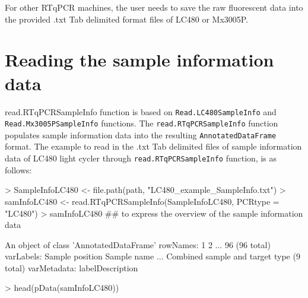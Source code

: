 \documentclass[11pt]{article}
\newcommand{\code}[1]{{\tt #1}}
\begin{document}
For other RTqPCR machines, the user needs to save the raw fluorescent data into the provided
.txt Tab delimited format files of LC480 or Mx3005P. 
\section{Reading the sample information data} 
read.RTqPCRSampleInfo function is based on \code{Read.LC480SampleInfo} and \code{Read.Mx3005PSampleInfo} 
functions. The \code{read.RTqPCRSampleInfo} function populates sample information data into the resulting 
\code{AnnotatedDataFrame} format. The example to read in the .txt Tab delimited files of sample information
data of LC480 light cycler through \code{read.RTqPCRSampleInfo} function, is as follows:
\begin{Schunk}
\begin{Sinput}
> SampleInfoLC480 <- file.path(path, "LC480_example_SampleInfo.txt")
> samInfoLC480 <- read.RTqPCRSampleInfo(SampleInfoLC480, PCRtype = "LC480")
> samInfoLC480  ## to express the overview of the sample information data
\end{Sinput}
\begin{Soutput}
An object of class 'AnnotatedDataFrame'
  rowNames: 1 2 ... 96 (96 total)
  varLabels: Sample position Sample name ... Combined sample and target
    type (9 total)
  varMetadata: labelDescription
\end{Soutput}
\begin{Sinput}
> head(pData(samInfoLC480))
\end{Sinput}
\end{Schunk}
\end{document}
